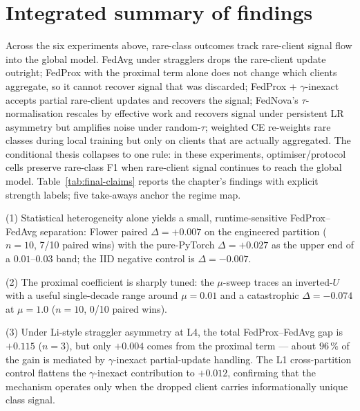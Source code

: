 \documentclass[11pt,a4paper]{report}
\begin{document}


\section{Integrated summary of findings}
\label{sec:integrated-summary}

Across the six experiments above, rare-class outcomes track rare-client
signal flow into the global model. FedAvg under stragglers drops the
rare-client update outright; FedProx with the proximal term alone does
not change which clients aggregate, so it cannot recover signal that was
discarded; FedProx + $\gamma$-inexact accepts partial rare-client updates
and recovers the signal; FedNova's $\tau$-normalisation rescales by
effective work and recovers signal under persistent LR asymmetry but
amplifies noise under random-$\tau$; weighted CE re-weights rare classes
during local training but only on clients that are actually aggregated.
The conditional thesis collapses to one rule: in these experiments,
optimiser/protocol cells preserve rare-class F1 when rare-client signal
continues to reach the global model. Table~\ref{tab:final-claims} reports the chapter's findings
with explicit strength labels; five take-aways anchor the regime map.

(1) Statistical heterogeneity alone yields a small, runtime-sensitive
FedProx--FedAvg separation: Flower paired $\Delta = +0.007$ on the
engineered partition ($n=10$, 7/10 paired wins) with the pure-PyTorch
$\Delta = +0.027$ as the upper end of a $0.01$--$0.03$ band; the IID
negative control is $\Delta = -0.007$.

(2) The proximal coefficient is sharply tuned: the $\mu$-sweep traces an
inverted-$U$ with a useful single-decade range around $\mu = 0.01$ and a
catastrophic $\Delta = -0.074$ at $\mu = 1.0$ ($n=10$, 0/10 paired wins).

(3) Under Li-style straggler asymmetry at L4, the total FedProx--FedAvg gap
is $+0.115$ ($n=3$), but only $+0.004$ comes from the proximal term ---
about $96\,\%$ of the gain is mediated by $\gamma$-inexact partial-update
handling. The L1 cross-partition control flattens the $\gamma$-inexact
contribution to $+0.012$, confirming that the mechanism operates only when
the dropped client carries informationally unique class signal.
\end{document}
